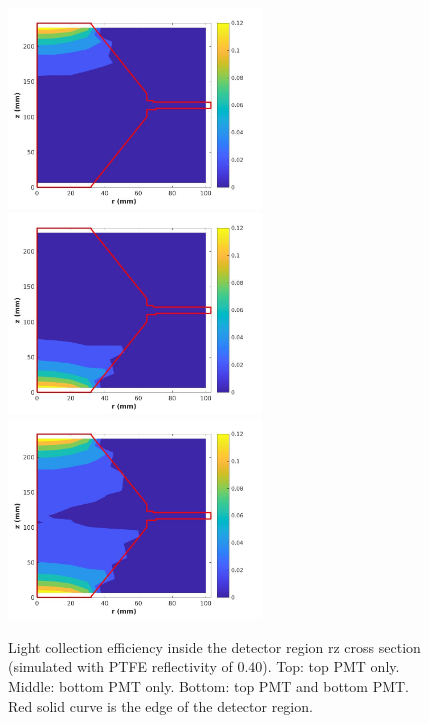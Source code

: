 \begin{figure}[ht!]
  \centering
  \includegraphics[width=0.6\textwidth]
  {Figures/Ch10/PDEvsCrossSectionTopPTFE040.jpg}
  \includegraphics[width=0.6\textwidth]
  {Figures/Ch10/PDEvsCrossSectionBotPTFE040.jpg}
  \includegraphics[width=0.6\textwidth]
  {Figures/Ch10/PDEvsCrossSectionTotPTFE040.jpg}
  \caption{Light collection efficiency inside the detector region rz cross section (simulated with PTFE reflectivity of $0.40$). Top: top PMT only. Middle: bottom PMT only. Bottom: top PMT and bottom PMT. Red solid curve is the edge of the detector region.}
  \label{fig: light collection cross section 040}
\end{figure}



